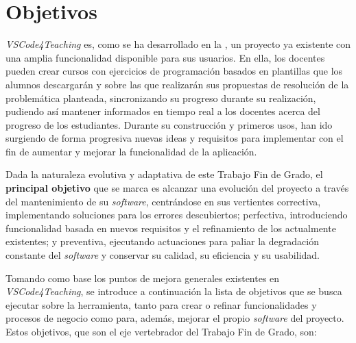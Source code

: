 \chapter{Objetivos}
\label{cap:objetivos}

\textit{VSCode4Teaching} es, como se ha desarrollado en la , un proyecto ya existente con una amplia funcionalidad disponible para sus usuarios. En ella, los docentes pueden crear cursos con ejercicios de programación basados en plantillas que los alumnos descargarán y sobre las que realizarán sus propuestas de resolución de la problemática planteada, sincronizando su progreso durante su realización, pudiendo así mantener informados en tiempo real a los docentes acerca del progreso de los estudiantes. Durante su construcción y primeros usos, han ido surgiendo de forma progresiva nuevas ideas y requisitos para implementar con el fin de aumentar y mejorar la funcionalidad de la aplicación.

Dada la naturaleza evolutiva y adaptativa de este Trabajo Fin de Grado, el \textbf{principal objetivo} que se marca es alcanzar una evolución del proyecto a través del mantenimiento de su \textit{software}, centrándose en sus vertientes correctiva, implementando soluciones para los errores descubiertos; perfectiva, introduciendo funcionalidad basada en nuevos requisitos y el refinamiento de los actualmente existentes; y preventiva, ejecutando actuaciones para paliar la degradación constante del \textit{software} y conservar su calidad, su eficiencia y su usabilidad.

Tomando como base los puntos de mejora generales existentes en \textit{VSCode4Teaching}, se introduce a continuación la lista de objetivos que se busca ejecutar sobre la herramienta, tanto para crear o refinar funcionalidades y procesos de negocio como para, además, mejorar el propio \textit{software} del proyecto. Estos objetivos, que son el eje vertebrador del Trabajo Fin de Grado, son:

